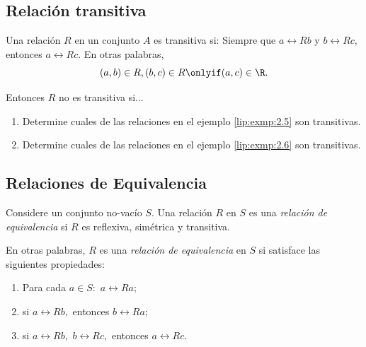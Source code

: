 \subsection{Relación transitiva}


	Una relación $R$ en un conjunto $A$ es transitiva si: Siempre que $a\rel{R}b$ y $b\rel{R}c,$ entonces $a\rel{R}c.$  En otras palabras, 
	$$
	(a,b)\in R, (b,c)\in R \onlyif (a,c)\in \R.
	$$
	
	
	Entonces $R$ no es transitiva si...



	\begin{problema}
		\label{lip:exmp:2.9}
		\begin{enumerate}
			\item   Determine cuales de las relaciones en el ejemplo \ref{lip:exmp:2.5} son transitivas.
			\item Determine cuales de las relaciones en el ejemplo \ref{lip:exmp:2.6} son transitivas.
		\end{enumerate}
		
	\end{problema}


% 
% 
% 
% 
% 

\subsection{Relaciones de Equivalencia}

	Considere un conjunto no-vacío $S.$ Una relación $R$ en $S$ es una \emph{relación de equivalencia} si $R$ es reflexiva, sim\'etrica y transitiva.



	En otras palabras, $R$ es una \emph{relación de equivalencia} en $S$ si satisface las siguientes propiedades:
	\begin{enumerate}
		\item Para cada $a\in S:$ $a\rel{R}a;$
		\item si $a\rel{R}b,$ entonces $b\rel{R}a;$
		\item si $a\rel{R}b,$ $b\rel{R}c,$ entonces $a\rel{R}c.$
	\end{enumerate}
	



